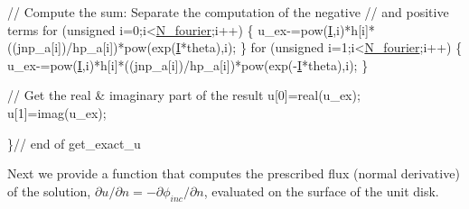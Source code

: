 \begin{DoxyCodeInclude}
  \textcolor{comment}{// Compute the sum: Separate the computation of the negative }
  \textcolor{comment}{// and positive terms}
  \textcolor{keywordflow}{for} (\textcolor{keywordtype}{unsigned} i=0;i<\hyperlink{namespaceGlobalParameters_ae4df03bf0ffa55b741ac846ca7b6c155}{N\_fourier};i++)
   \{
    u\_ex-=pow(\hyperlink{namespaceGlobalParameters_a7642bd7303d39de0d680340586b7df60}{I},i)*h[i]*((jnp\_a[i])/hp\_a[i])*pow(exp(\hyperlink{namespaceGlobalParameters_a7642bd7303d39de0d680340586b7df60}{I}*theta),i);
   \}
  \textcolor{keywordflow}{for} (\textcolor{keywordtype}{unsigned} i=1;i<\hyperlink{namespaceGlobalParameters_ae4df03bf0ffa55b741ac846ca7b6c155}{N\_fourier};i++)
   \{
    u\_ex-=pow(\hyperlink{namespaceGlobalParameters_a7642bd7303d39de0d680340586b7df60}{I},i)*h[i]*((jnp\_a[i])/hp\_a[i])*pow(exp(-\hyperlink{namespaceGlobalParameters_a7642bd7303d39de0d680340586b7df60}{I}*theta),i);
   \}
  
  \textcolor{comment}{// Get the real & imaginary part of the result}
  u[0]=real(u\_ex);
  u[1]=imag(u\_ex);
  
 \}\textcolor{comment}{// end of get\_exact\_u}

\end{DoxyCodeInclude}


Next we provide a function that computes the prescribed flux (normal derivative) of the solution, $ \partial u/\partial n = -\partial \phi_{inc}/\partial n $, evaluated on the surface of the unit disk.


